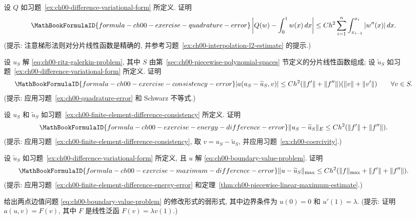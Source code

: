 \begin{MBExercise}
\label{ex:ch00-quadrature-error}
设 $Q$ 如习题~\ref{ex:ch00-difference-variational-form} 所定义. 证明
\[
\MathBookFormulaID{formula-ch00-exercise-quadrature-error}
\left|Q(w)-\int_0^1w(x)\,dx\right|
\leq Ch^2\sum_{i=1}^n\int_{x_{i-1}}^{x_i}|w''(x)|\,dx.
\]
(提示: 注意梯形法则对分片线性函数是精确的, 并参考习题~\ref{ex:ch00-interpolation-l2-estimate} 的提示.)
\end{MBExercise}

\begin{MBExercise}
\label{ex:ch00-finite-element-difference-consistency}
设 $u_S$ 解 \eqref{eq:ch00-ritz-galerkin-problem}, 其中 $S$ 由第~\ref{sec:ch00-piecewise-polynomial-spaces} 节定义的分片线性函数组成; 设 $\widetilde u_S$ 如习题~\ref{ex:ch00-difference-variational-form} 所定义. 证明
\[
\MathBookFormulaID{formula-ch00-exercise-consistency-error}
|a(u_S-\widetilde u_S,v)|
\leq Ch^2(\|f'\|+\|f''\|)(\|v\|+\|v'\|)
\qquad\forall v\in S.
\]
(提示: 应用习题~\ref{ex:ch00-quadrature-error} 和 Schwarz 不等式.)
\end{MBExercise}

\begin{MBExercise}
\label{ex:ch00-finite-element-difference-energy-error}
设 $u_S$ 和 $\widetilde u_S$ 如习题~\ref{ex:ch00-finite-element-difference-consistency} 所定义. 证明
\[
\MathBookFormulaID{formula-ch00-exercise-energy-difference-error}
\|u_S-\widetilde u_S\|_E
\leq Ch^2(\|f'\|+\|f''\|).
\]
(提示: 应用习题~\ref{ex:ch00-finite-element-difference-consistency}, 取 $v=u_S-\widetilde u_S$, 并应用习题~\ref{ex:ch00-coercivity}.)
\end{MBExercise}

\begin{MBExercise}
\label{ex:ch00-difference-maximum-error}
设 $\widetilde u_S$ 如习题~\ref{ex:ch00-difference-variational-form} 所定义, 且 $u$ 解 \eqref{eq:ch00-boundary-value-problem}. 证明
\[
\MathBookFormulaID{formula-ch00-exercise-maximum-difference-error}
\|u-\widetilde u_S\|_{\max}
\leq Ch^2(\|f\|_{\max}+\|f'\|+\|f''\|).
\]
(提示: 应用习题~\ref{ex:ch00-finite-element-difference-energy-error} 和定理~\ref{thm:ch00-piecewise-linear-maximum-estimate}.)
\end{MBExercise}

\begin{MBExercise}
\label{ex:ch00-nonhomogeneous-neumann-data}
给出两点边值问题 \eqref{eq:ch00-boundary-value-problem} 的修改形式的弱形式, 其中边界条件为 $u(0)=0$ 和 $u'(1)=\lambda$. (提示: 证明 $a(u,v)=F(v)$, 其中 $F$ 是线性泛函 $F(v)=\lambda v(1)$.)
\end{MBExercise}

